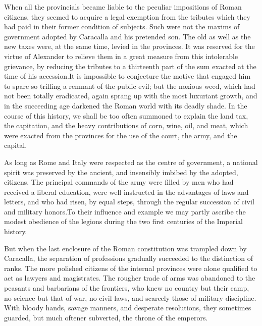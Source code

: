 When all the provincials became liable to the peculiar
impositions of Roman citizens, they seemed to acquire a legal
exemption from the tributes which they had paid in their former
condition of subjects. Such were not the maxims of government
adopted by Caracalla and his pretended son. The old as well as
the new taxes were, at the same time, levied in the provinces. It
was reserved for the virtue of Alexander to relieve them in a
great measure from this intolerable grievance, by reducing the
tributes to a thirteenth part of the sum exacted at the time of
his accession.\footnotemark[115] It is impossible to conjecture the motive that
engaged him to spare so trifling a remnant of the public evil;
but the noxious weed, which had not been totally eradicated,
again sprang up with the most luxuriant growth, and in the
succeeding age darkened the Roman world with its deadly shade. In
the course of this history, we shall be too often summoned to
explain the land tax, the capitation, and the heavy contributions
of corn, wine, oil, and meat, which were exacted from the
provinces for the use of the court, the army, and the capital.


As long as Rome and Italy were respected as the centre of
government, a national spirit was preserved by the ancient, and
insensibly imbibed by the adopted, citizens. The principal
commands of the army were filled by men who had received a
liberal education, were well instructed in the advantages of laws
and letters, and who had risen, by equal steps, through the
regular succession of civil and military honors.\footnotemark[116] To their
influence and example we may partly ascribe the modest obedience
of the legions during the two first centuries of the Imperial
history.


But when the last enclosure of the Roman constitution was
trampled down by Caracalla, the separation of professions
gradually succeeded to the distinction of ranks. The more
polished citizens of the internal provinces were alone qualified
to act as lawyers and magistrates. The rougher trade of arms was
abandoned to the peasants and barbarians of the frontiers, who
knew no country but their camp, no science but that of war, no
civil laws, and scarcely those of military discipline. With
bloody hands, savage manners, and desperate resolutions, they
sometimes guarded, but much oftener subverted, the throne of the
emperors.

